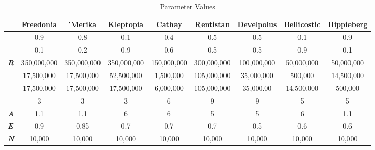 \documentclass[12pt]{article}
\begin{document}
\begin{spacing}{1.5}

\begin{table}[]
\centering
\begin{tiny}
\caption{Parameter Values}
\begin{tabular}{lcccccccc}
\toprule
                    & \textbf{Freedonia} & \textbf{'Merika} & \textbf{Kleptopia} & \textbf{Cathay} & \textbf{Rentistan} & \textbf{Develpolus} & \textbf{Bellicostic} & \textbf{Hippieberg} \\ \hline
\boldmath{$\alpha$}   & 0.9              & 0.8              & 0.1                & 0.4             & 0.5                & 0.5                 & 0.1                  & 0.9                 \\
\boldmath{$\gamma$}   & 0.1                & 0.2              & 0.9                & 0.6             & 0.5                & 0.5                 & 0.9                  & 0.1                 \\
\textit{\textbf{R}} & 350,000,000        & 350,000,000      & 350,000,000        & 150,000,000     & 300,000,000        & 100,000,000         & 50,000,000           & 50,000,000          \\
\boldmath{$\Phi$}     & 17,500,000         & 17,500,000       & 52,500,000         & 1,500,000       & 105,000,000        & 35,000,000          & 500,000              & 14,500,000          \\
\boldmath{$\Omega$}   & 17,500,000         & 17,500,000       & 17,500,000         & 6,000,000       & 105,000,000        & 35,000.00           & 14,500,000           & 500,000             \\
\boldmath{$\sigma$}   & 3                  & 3                & 3                  & 6               & 9                  & 9                   & 5                    & 5                   \\
\textit{\textbf{A}} & 1.1                & 1.1              & 6                  & 6               & 5                  & 5                   & 6                    & 1.1                 \\
\textit{\textbf{E}} & 0.9                & 0.85             & 0.7                & 0.7             & 0.7                & 0.5                 & 0.6                  & 0.6                 \\
\textit{\textbf{N}} & 10,000             & 10,000           & 10,000             & 10,000          & 10,000             & 10,000              & 10,000               & 10,000 \\ \hline            
\end{tabular}
\end{tiny}
\end{table}


\end{spacing}
\end{document}
